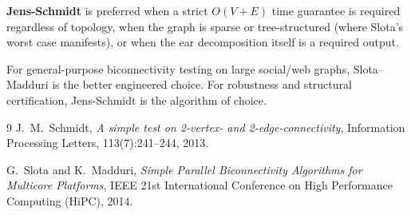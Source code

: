 \documentclass[12pt,a4paper]{article}
\begin{document}
\textbf{Jens-Schmidt} is preferred when a strict $O(V+E)$ time guarantee
is required regardless of topology, when the graph is sparse or
tree-structured (where Slota's worst case manifests), or when the ear
decomposition itself is a required output.

For general-purpose biconnectivity testing on large social/web graphs,
Slota--Madduri is the better engineered choice.  For robustness and
structural certification, Jens-Schmidt is the algorithm of choice.


\begin{thebibliography}{9}
    J.\ M.\ Schmidt,
    \textit{A simple test on 2-vertex- and 2-edge-connectivity},
    Information Processing Letters, 113(7):241--244, 2013.

    G.\ Slota and K.\ Madduri,
    \textit{Simple Parallel Biconnectivity Algorithms for Multicore Platforms},
    IEEE 21st International Conference on High Performance Computing (HiPC), 2014.
\end{thebibliography}
\end{document}
